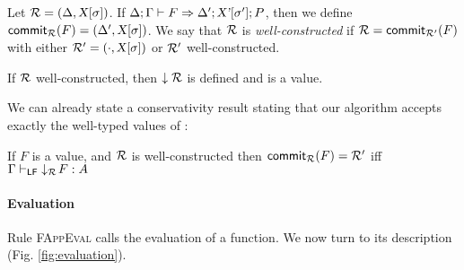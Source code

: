 \documentclass{llncs}
\begin{document}
\begin{definition}
  Let $\mathcal{R} = (\Delta, {\text{\textsl{X}}}[{\sigma}])$.  If ${{\Delta}; {\Gamma}}\vdash{{{F}}\Rightarrow{{\Delta'};{{\ensuremath{\text{\textsl{X'}}}}[{\sigma'}]};{P}}}$, then we define ${\text{\textsf{commit$_{\mathcal{R}}$}}}({F}) =
  (\Delta', {\text{\textsl{X}}}[{\sigma}])$. We say that $\mathcal{R}$ is
  \emph{well-constructed} if $\mathcal{R} = {\text{\textsf{commit$_{\mathcal{R'}}$}}}({F})$ with either
  $\mathcal{R'}=(\cdot, {\text{\textsl{X}}}[{\sigma}])$ or $\mathcal{R'}$ well-constructed.
\end{definition}

\begin{lemma}
  If $\mathcal{R}$ well-constructed, then $\downarrow{\mathcal{R}}$ is defined and is a
  value.
\end{lemma}

We can already state a conservativity result stating that our
algorithm accepts exactly the well-typed values of \LF:

\begin{theorem}
  If $F$ is a value, and $\mathcal{R}$ is well-constructed then ${\text{\textsf{commit$_{\mathcal{R}}$}}}({F})
  = \mathcal{R'}$ iff ${\Gamma}\vdash_{{\mathsf{LF}}}{{\downarrow_{\mathcal{R}}\!{F}}:{A}}$
\end{theorem}

\paragraph{Evaluation}

Rule \textsc{FAppEval} calls the evaluation of a function. We now turn
to its description (Fig. \ref{fig:evaluation}).



\end{document}
